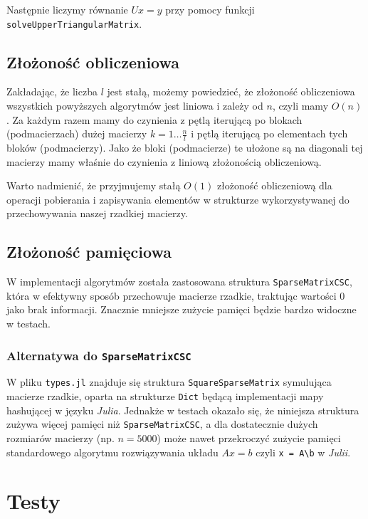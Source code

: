 \documentclass[10pt]{article}
\begin{document}
\noindent Następnie liczymy równanie $Ux = y$ przy pomocy funkcji \texttt{solveUpperTriangularMatrix}.


\subsection{Złożoność obliczeniowa}

Zakładając, że liczba $l$ jest stałą, możemy powiedzieć, że złożoność obliczeniowa wszystkich powyższych algorytmów jest liniowa i zależy od $n$, czyli mamy $O(n)$. Za każdym razem mamy do czynienia z pętlą iterującą po blokach (podmacierzach) dużej macierzy $k = 1\dots \frac{n}{l}$ i pętlą iterującą po elementach tych bloków (podmacierzy). Jako że bloki (podmacierze) te ułożone są na diagonali tej macierzy mamy właśnie do czynienia z liniową złożonością obliczeniową.

Warto nadmienić, że przyjmujemy stałą $O(1)$ złożoność obliczeniową dla operacji pobierania i zapisywania elementów w strukturze wykorzystywanej do przechowywania naszej rzadkiej macierzy.

\subsection{Złożoność pamięciowa}

W implementacji algorytmów została zastosowana struktura \texttt{SparseMatrixCSC}, która w efektywny sposób przechowuje macierze rzadkie, traktując wartości $0$ jako brak informacji. Znacznie mniejsze zużycie pamięci będzie bardzo widoczne w testach.

\subsubsection{Alternatywa do \texttt{SparseMatrixCSC}}

W pliku \texttt{types.jl} znajduje się struktura \texttt{SquareSparseMatrix} symulująca macierze rzadkie, oparta na strukturze \texttt{Dict} będącą implementacji mapy hashującej w języku \textit{Julia}. Jednakże w testach okazało się, że niniejsza struktura zużywa więcej pamięci niż \texttt{SparseMatrixCSC}, a dla dostatecznie dużych rozmiarów macierzy (np. $n=5000$) może nawet przekroczyć zużycie pamięci standardowego algorytmu rozwiązywania układu $Ax = b$ czyli \texttt{x = A\textbackslash b} w \textit{Julii}.

\section{Testy}
\end{document}
